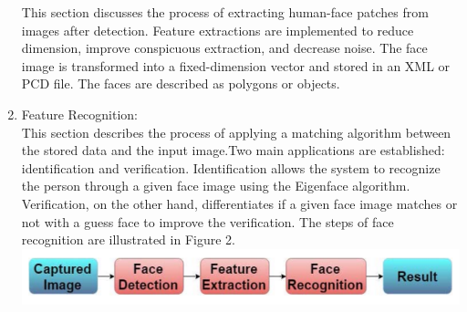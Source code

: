 \documentclass{report}
\begin{document}
\begin{multicols}{1}
\begin{enumerate}
        This section discusses the process of extracting human-face patches from images after detection. Feature extractions are implemented to reduce dimension, improve conspicuous extraction, and decrease noise. The face image is transformed into a fixed-dimension vector and stored in an XML or PCD file. The faces are described as polygons or objects.
        \item Feature Recognition: \\
        This section describes the process of applying a matching algorithm between the stored data and the input image.Two main applications are established: identification and verification. Identification allows the system to recognize the person through a given face image using the Eigenface algorithm. Verification, on the other hand, differentiates if a given face image matches or not with a guess face to improve the verification. The steps of face recognition are illustrated in Figure 2.
        \includegraphics{images/face_recognition.png}\\
    \end{enumerate}
\end{multicols}

\vspace*{0.6cm}
\small
\textit{}
\end{document}
